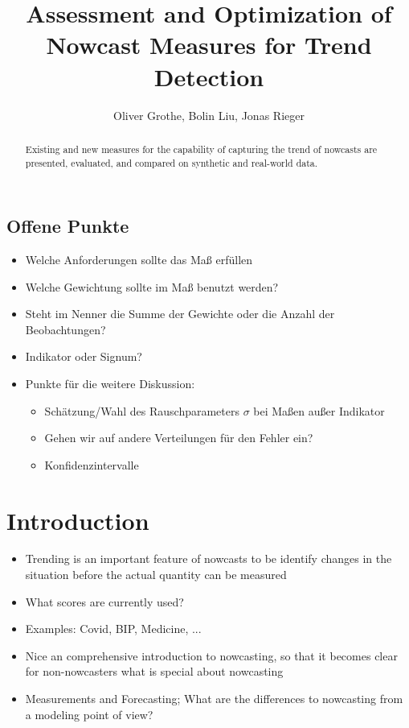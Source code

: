 \documentclass[oneside]{article}
\title{Assessment and Optimization of Nowcast Measures for Trend Detection}
\author{Oliver Grothe, Bolin Liu, Jonas Rieger}
\theoremstyle{plain}%
\theoremstyle{definition}
\begin{document}
\maketitle

\begin{abstract}
Existing and new measures for the capability of capturing the trend of nowcasts are presented, evaluated, and compared on synthetic and real-world data.
\end{abstract}

\subsection*{Offene Punkte}

\begin{itemize}
    \item Welche Anforderungen sollte das Maß erfüllen
    \item Welche Gewichtung sollte im Maß benutzt werden?
    \item Steht im Nenner die Summe der Gewichte oder die Anzahl der Beobachtungen?
    \item Indikator oder Signum?
    \item Punkte für die weitere Diskussion:
    \begin{itemize}
        \item Schätzung/Wahl des Rauschparameters $\sigma$ bei Maßen außer Indikator
        \item Gehen wir auf andere Verteilungen für den Fehler ein?
        \item Konfidenzintervalle
    \end{itemize}
\end{itemize}

\listoftodos


\section{Introduction}

\begin{itemize}
	\item Trending is an important feature of nowcasts to be identify changes in the situation before the actual quantity can be measured
	\item What scores are currently used?
	\item Examples: Covid, BIP, Medicine, ... 
 \item Nice an comprehensive introduction to nowcasting, so that it becomes clear for non-nowcasters what is special about nowcasting
 \item Measurements and Forecasting; What are the differences to nowcasting from a modeling point of view?
\end{itemize}
\end{document}

